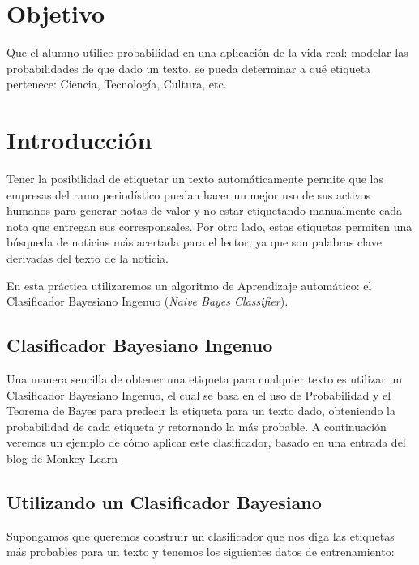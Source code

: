\section{Objetivo}
Que el alumno utilice probabilidad en una aplicación de la vida real: modelar las probabilidades de que dado un texto, se pueda determinar a qué etiqueta pertenece: Ciencia, Tecnología, Cultura, etc. \par

\section{Introducción} 

Tener la posibilidad de etiquetar un texto automáticamente permite que las empresas del ramo periodístico puedan hacer un mejor uso de sus activos humanos para generar notas de valor y no estar etiquetando manualmente cada nota que entregan sus corresponsales. Por otro lado, estas etiquetas permiten una búsqueda de noticias más acertada para el lector, ya que son palabras clave derivadas del texto de la noticia.

En esta práctica utilizaremos un algoritmo de Aprendizaje automático: el Clasificador Bayesiano Ingenuo (\textit{Naive Bayes Classifier}).

\subsection{Clasificador Bayesiano Ingenuo}

Una manera sencilla de obtener una etiqueta para cualquier texto es utilizar un Clasificador Bayesiano Ingenuo, el cual se basa en el uso de Probabilidad y el Teorema de Bayes para predecir la etiqueta para un texto dado, obteniendo la probabilidad de cada etiqueta y retornando la más probable. A continuación veremos un ejemplo de cómo aplicar este clasificador, basado en una entrada del blog de Monkey Learn \parencite{Stecanella2017}


\subsection{Utilizando un Clasificador Bayesiano}

Supongamos que queremos construir un clasificador que nos diga las etiquetas más probables para un texto y tenemos los siguientes datos de entrenamiento:

